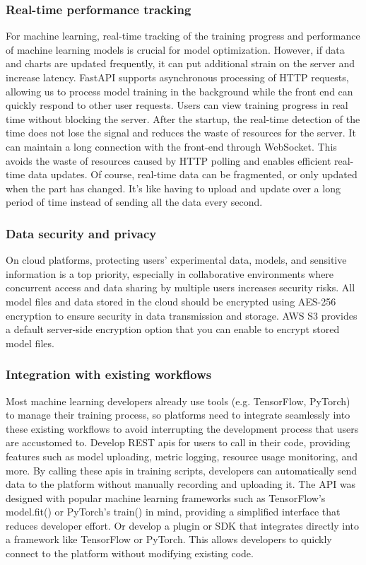 \documentclass[12pt]{article}
\begin{document}
\subsubsection{Real-time performance tracking}
For machine learning, real-time tracking of the training progress and performance of machine learning models is crucial for model optimization. However, if data and charts are updated frequently, it can put additional strain on the server and increase latency. FastAPI supports asynchronous processing of HTTP requests, allowing us to process model training in the background while the front end can quickly respond to other user requests. Users can view training progress in real time without blocking the server. After the startup, the real-time detection of the time does not lose the signal and reduces the waste of resources for the server. It can maintain a long connection with the front-end through WebSocket. This avoids the waste of resources caused by HTTP polling and enables efficient real-time data updates. Of course, real-time data can be fragmented, or only updated when the part has changed. It's like having to upload and update over a long period of time instead of sending all the data every second.
\subsubsection{Data security and privacy}
On cloud platforms, protecting users' experimental data, models, and sensitive information is a top priority, especially in collaborative environments where concurrent access and data sharing by multiple users increases security risks. All model files and data stored in the cloud should be encrypted using AES-256 encryption to ensure security in data transmission and storage. AWS S3 provides a default server-side encryption option that you can enable to encrypt stored model files.
\subsubsection{Integration with existing workflows}
Most machine learning developers already use tools (e.g. TensorFlow, PyTorch) to manage their training process, so platforms need to integrate seamlessly into these existing workflows to avoid interrupting the development process that users are accustomed to. Develop REST apis for users to call in their code, providing features such as model uploading, metric logging, resource usage monitoring, and more. By calling these apis in training scripts, developers can automatically send data to the platform without manually recording and uploading it.
The API was designed with popular machine learning frameworks such as TensorFlow's model.fit() or PyTorch's train() in mind, providing a simplified interface that reduces developer effort. Or develop a plugin or SDK that integrates directly into a framework like TensorFlow or PyTorch. This allows developers to quickly connect to the platform without modifying existing code.
\end{document}
